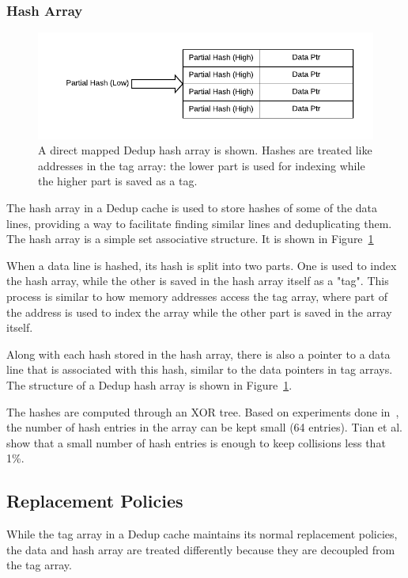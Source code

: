 \subsubsection{Hash Array}
\label{sssec:DedupHash}
\begin{figure}
    \includegraphics[width=\textwidth]{Dedup_Hash.pdf}
    \caption[Dedup Hash Array]{A direct mapped Dedup hash array is shown. Hashes are treated like addresses in the tag array: the lower part is used for indexing while the higher part is saved as a tag.}
    \label{fig:DedupHash}
\end{figure}
The hash array in a Dedup cache is used to store hashes of some of the data lines, providing a way to facilitate finding similar lines and deduplicating them. The hash array is a simple set associative structure. It is shown in Figure~\ref{fig:DedupHash}\par
When a data line is hashed, its hash is split into two parts. One is used to index the hash array, while the other is saved in the hash array itself as a "tag". This process is similar to how memory addresses access the tag array, where part of the address is used to index the array while the other part is saved in the array itself.\par
Along with each hash stored in the hash array, there is also a pointer to a data line that is associated with this hash, similar to the data pointers in tag arrays. The structure of a Dedup hash array is shown in Figure~\ref{fig:DedupHash}.\par
The hashes are computed through an XOR tree. Based on experiments done in~\cite{dedup}, the number of hash entries in the array can be kept small (64 entries). Tian et al. show that a small number of hash entries is enough to keep collisions less that 1\%.

\subsection{Replacement Policies}
\label{ssec:DedupRepl}
While the tag array in a Dedup cache maintains its normal replacement policies, the data and hash array are treated differently because they are decoupled from the tag array.
